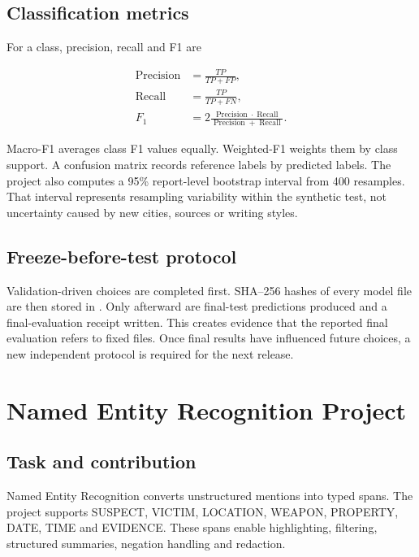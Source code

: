 \documentclass[12pt,a4paper]{report}
\begin{document}
\section{Classification metrics}

For a class, precision, recall and F1 are

\begin{align}
\operatorname{Precision}&=\frac{TP}{TP+FP},\\
\operatorname{Recall}&=\frac{TP}{TP+FN},\\
F_1&=2\frac{\operatorname{Precision}\cdot\operatorname{Recall}}
{\operatorname{Precision}+\operatorname{Recall}}.
\end{align}

Macro-F1 averages class F1 values equally. Weighted-F1 weights them by class support. A confusion matrix records reference labels by predicted labels. The project also computes a 95\% report-level bootstrap interval from 400 resamples. That interval represents resampling variability within the synthetic test, not uncertainty caused by new cities, sources or writing styles.

\section{Freeze-before-test protocol}

Validation-driven choices are completed first. SHA--256 hashes of every model file are then stored in . Only afterward are final-test predictions produced and a final-evaluation receipt written. This creates evidence that the reported final evaluation refers to fixed files. Once final results have influenced future choices, a new independent protocol is required for the next release.

\chapter{Named Entity Recognition Project}

\section{Task and contribution}

Named Entity Recognition converts unstructured mentions into typed spans. The project supports SUSPECT, VICTIM, LOCATION, WEAPON, PROPERTY, DATE, TIME and EVIDENCE. These spans enable highlighting, filtering, structured summaries, negation handling and redaction.
\end{document}
